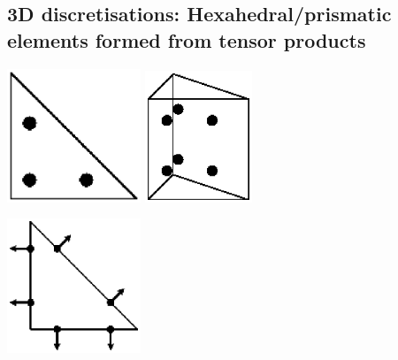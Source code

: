 \documentclass[landscape]{imposter}
\begin{document}
\begin{multicols*}{3}
  \section{3D discretisations: Hexahedral/prismatic elements formed from tensor products
  \cite{tensor2016}}
\centerline{ \hspace{1cm}
\includegraphics[width=4cm]{l2_tri} 
\raisebox{1cm}{\Large $\otimes$}
 \raisebox{0.4cm}{\Large $=$}
\includegraphics[width=3.2cm]{l2l2_prism}}
\centerline{\hspace{1cm}
\includegraphics[width=4cm]{hdiv_tri} 
 \raisebox{1cm}{\Large $\otimes$}
 \raisebox{1.2cm}{\Large $=$}
 }

\end{multicols*}
\end{document}
